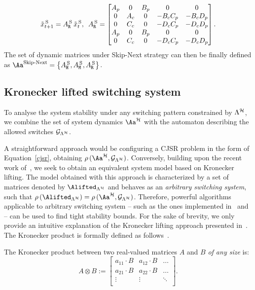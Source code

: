 %
\begin{equation*}
    \tilde x_{t+1}^{\,\text{S}} = A^{\,\text{S}}_{\texttt{R}} \, \tilde x_{t}^{\,\text{S}},\,\,\,
    A^{\,\text{S}}_{\texttt{R}} = \begin{bmatrix}
        A_p & 0    & B_p & 0       & 0 \\
        0   & A_c  & 0   & -B_cC_p & -B_cD_p \\
        0   & C_c  & 0   & -D_cC_p & -D_cD_p \\
        A_p & 0    & B_p & 0       & 0 \\
        0   & C_c  & 0   & -D_cC_p & -D_cD_p \\
    \end{bmatrix}.
\end{equation*}
%
The set of dynamic matrices under Skip-Next strategy can then be finally defined as $\Aa^{\text{Skip-Next}}=\left\{A^{\,\text{S}}_{\cH},A^{\,\text{S}}_{\cM},A^{\,\text{S}}_{\cR}\right\}$.

\subsection{Kronecker lifted switching system}%
\label{sec:system_dynamics}
%
To analyse the system stability under any switching pattern constrained by $\Lambda^{\mathcal{H}}$, we combine the set of system dynamics $\Aa^\strat$ with the automaton describing the allowed switches $\mathcal{G}_{\Lambda^{\mathcal{H}}}$.

A straightforward approach would be configuring a CJSR problem in the form of Equation~\eqref{cjsr}, obtaining $\rho\,(\Aa^\strat,\GG{\Lambda^\strat})$.
%
Conversely, building upon the recent work of~\cite{xu2020approximation}, we seek to obtain an equivalent system model based on Kronecker lifting.
The model obtained with this approach is characterized by a set of matrices denoted by $\Alifted_{\Lambda^\strat}$ and behaves as an \emph{arbitrary switching system}, such that $\rho\,(\Alifted_{\Lambda^\strat})= \rho\,(\Aa^{\strat},\GG{\Lambda^\strat})$.
Therefore, powerful algorithms applicable to arbitrary switching system -- such as the ones implemented in~\cite{vankeerberghen2014jsr} and \cite{sparsejsr} -- can be used to find tight stability bounds.
For the sake of brevity, we only provide an intuitive explanation of the Kronecker lifting approach presented in~\cite{xu2020approximation}.
The Kronecker product is formally defined as follows~\cite{horn2012matrix}.

\begin{definition}%
    The Kronecker product between two real-valued matrices $A$ and $B$ \emph{of any size} is:%
    \begin{equation*}
        A \otimes B :=
        \begin{bmatrix}
            a_{11}\cdot B   & a_{12}\cdot B & \hdots \\
            a_{21}\cdot B   & a_{22}\cdot B & \hdots \\
            \vdots          & \vdots        & \ddots\\
      \end{bmatrix}.
    \end{equation*}
\end{definition}

